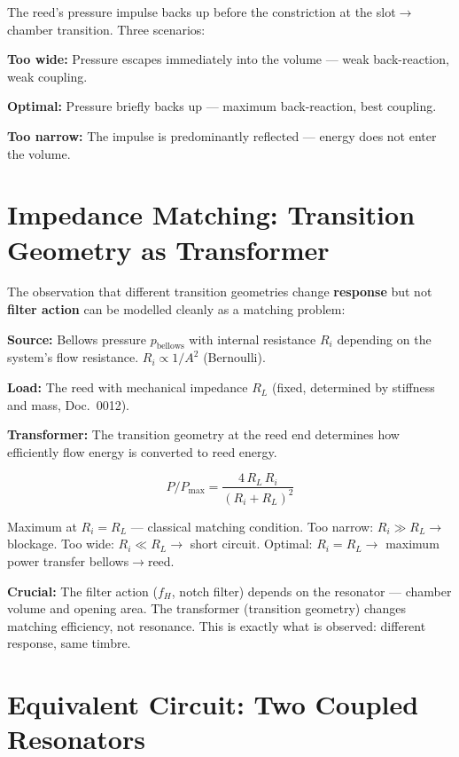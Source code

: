\documentclass[11pt,a4paper]{article}
\begin{document}
The reed's pressure impulse backs up before the constriction at the slot$\to$chamber transition. Three scenarios:

\textbf{Too wide:} Pressure escapes immediately into the volume --- weak back-reaction, weak coupling.

\textbf{Optimal:} Pressure briefly backs up --- maximum back-reaction, best coupling.

\textbf{Too narrow:} The impulse is predominantly reflected --- energy does not enter the volume.

\section{Impedance Matching: Transition Geometry as Transformer}

The observation that different transition geometries change \textbf{response} but not \textbf{filter action} can be modelled cleanly as a matching problem:

\textbf{Source:} Bellows pressure $p_\mathrm{bellows}$ with internal resistance $R_i$ depending on the system's flow resistance. $R_i \propto 1/A^2$ (Bernoulli).

\textbf{Load:} The reed with mechanical impedance $R_L$ (fixed, determined by stiffness and mass, Doc.~0012).

\textbf{Transformer:} The transition geometry at the reed end determines how efficiently flow energy is converted to reed energy.

\begin{equation}
P / P_\mathrm{max} = \frac{4 \, R_L \, R_i}{(R_i + R_L)^2}
\end{equation}

Maximum at $R_i = R_L$ --- classical matching condition. Too narrow: $R_i \gg R_L \to$ blockage. Too wide: $R_i \ll R_L \to$ short circuit. Optimal: $R_i = R_L \to$ maximum power transfer bellows$\to$reed.

\begin{tcolorbox}[colframe=keygreen, colback=green!5!white]
\textbf{Crucial:} The filter action ($f_H$, notch filter) depends on the resonator --- chamber volume and opening area. The transformer (transition geometry) changes matching efficiency, not resonance. This is exactly what is observed: different response, same timbre.
\end{tcolorbox}

\section{Equivalent Circuit: Two Coupled Resonators}
\end{document}
